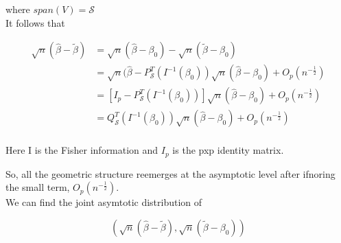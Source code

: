\documentclass[11pt,fleqn]{book} %
\begin{document}
where $span(V) = \mathcal{S}$\\

It follows that

		\begin{align*}
			\sqrt{n}(\hat{\beta} - \tilde{\beta}) &= \sqrt{n}(\hat{\beta} - \beta_0) - \sqrt{n}(\tilde{\beta} - \beta_0)\\
				&= \sqrt{n}(\hat{\beta} - P^T_\mathcal{S}(I^{-1}(\beta_0))\sqrt{n}(\hat{\beta} - \beta_0) + O_p(n^{-\frac{1}{2}})\\
				&=[I_p - P^T_\mathcal{S}(I^{-1}(\beta_0))]\sqrt{n}(\hat{\beta} - \beta_0) + O_p(n^{-\frac{1}{2}})\\
				&=Q^T_\mathcal{S}(I^{-1}(\beta_0))\sqrt{n}(\hat{\beta} - \beta_0) + O_p(n^{-\frac{1}{2}})\\
		\end{align*}

		\begin{remark}
			Here I is the Fisher information and $I_p$ is the pxp identity matrix.
		\end{remark}

So, all the geometric structure reemerges at the asymptotic level after ifnoring the small term, $O_p(n^{-\frac{1}{2}})$.\\

We can find the joint asymtotic distribution of 

		$$(\sqrt{n}(\hat{\beta} - \tilde{\beta}), \sqrt{n}(\tilde{\beta} - \beta_0)) $$
\end{document}
